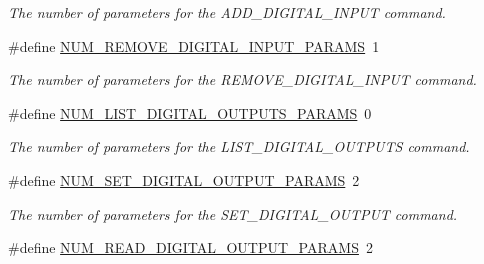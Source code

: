 \begin{DoxyCompactItemize}
\begin{DoxyCompactList}\small\item\em The number of parameters for the A\-D\-D\-\_\-\-D\-I\-G\-I\-T\-A\-L\-\_\-\-I\-N\-P\-U\-T command. \end{DoxyCompactList}\item 
\hypertarget{group__command__interpreter_ga6096182153b5f1ed0b7c7f02337c1782}{\#define \hyperlink{group__command__interpreter_ga6096182153b5f1ed0b7c7f02337c1782}{N\-U\-M\-\_\-\-R\-E\-M\-O\-V\-E\-\_\-\-D\-I\-G\-I\-T\-A\-L\-\_\-\-I\-N\-P\-U\-T\-\_\-\-P\-A\-R\-A\-M\-S}~1}\label{group__command__interpreter_ga6096182153b5f1ed0b7c7f02337c1782}

\begin{DoxyCompactList}\small\item\em The number of parameters for the R\-E\-M\-O\-V\-E\-\_\-\-D\-I\-G\-I\-T\-A\-L\-\_\-\-I\-N\-P\-U\-T command. \end{DoxyCompactList}\item 
\hypertarget{group__command__interpreter_ga3d5083d6431df96a397de8cfad75d3b4}{\#define \hyperlink{group__command__interpreter_ga3d5083d6431df96a397de8cfad75d3b4}{N\-U\-M\-\_\-\-L\-I\-S\-T\-\_\-\-D\-I\-G\-I\-T\-A\-L\-\_\-\-O\-U\-T\-P\-U\-T\-S\-\_\-\-P\-A\-R\-A\-M\-S}~0}\label{group__command__interpreter_ga3d5083d6431df96a397de8cfad75d3b4}

\begin{DoxyCompactList}\small\item\em The number of parameters for the L\-I\-S\-T\-\_\-\-D\-I\-G\-I\-T\-A\-L\-\_\-\-O\-U\-T\-P\-U\-T\-S command. \end{DoxyCompactList}\item 
\hypertarget{group__command__interpreter_gaac55dd13b66c6ed14773e930596be11e}{\#define \hyperlink{group__command__interpreter_gaac55dd13b66c6ed14773e930596be11e}{N\-U\-M\-\_\-\-S\-E\-T\-\_\-\-D\-I\-G\-I\-T\-A\-L\-\_\-\-O\-U\-T\-P\-U\-T\-\_\-\-P\-A\-R\-A\-M\-S}~2}\label{group__command__interpreter_gaac55dd13b66c6ed14773e930596be11e}

\begin{DoxyCompactList}\small\item\em The number of parameters for the S\-E\-T\-\_\-\-D\-I\-G\-I\-T\-A\-L\-\_\-\-O\-U\-T\-P\-U\-T command. \end{DoxyCompactList}\item 
\hypertarget{group__command__interpreter_ga8e7fef9c50e4a2992d7ac233d7e65510}{\#define \hyperlink{group__command__interpreter_ga8e7fef9c50e4a2992d7ac233d7e65510}{N\-U\-M\-\_\-\-R\-E\-A\-D\-\_\-\-D\-I\-G\-I\-T\-A\-L\-\_\-\-O\-U\-T\-P\-U\-T\-\_\-\-P\-A\-R\-A\-M\-S}~2}\label{group__command__interpreter_ga8e7fef9c50e4a2992d7ac233d7e65510}


\end{DoxyCompactItemize}
